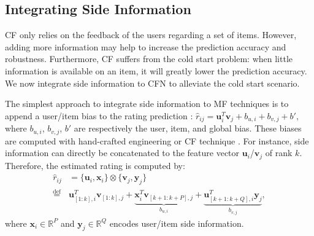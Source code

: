 \documentclass{article}
\newcommand{\mtx}[1]{\ensuremath{\mathbf{#1}}}
\begin{document}
\subsection{Integrating Side Information}
\label{sec:sideinfo}

CF only relies on the feedback of the users regarding a set of items. However, adding more information may help to increase the prediction accuracy and robustness. Furthermore, CF suffers from the cold start problem: when little information is available on an item, it will greatly lower the prediction accuracy. We now integrate side information to CFN to alleviate the cold start scenario. 

The simplest approach to integrate side information to MF techniques is to append a user/item bias to the rating prediction \cite{Koren2009}: 
$\hat{r}_{ij} = \mtx{u}_i^T\mtx{v}_j + b_{u,i} + b_{v,j} + b',$
where $b_{u,i}$, $b_{v,j}$, $b'$ are respectively the user, item, and global bias. These biases are computed with hand-crafted engineering or CF technique \cite{Chen2012,Porteous2010,Rendle2010}. For instance, side information can directly be concatenated to the feature vector $\mtx{u}_i$/$\mtx{v}_j$ of rank $k$. Therefore, the estimated rating is computed by:
\begin{align}\label{eq:side_info1}
\hat{r}_{ij} &= \{\mtx{u}_i, \mtx{x}_i\} \otimes \{\mtx{v}_j, \mtx{y}_j\} \\
 \stackrel{\text{def}}{=} &
\mtx{u}_{[1:k], i}^T\mtx{v}_{[1:k], j} + 
\underbrace{\mtx{x}_i^T\mtx{v}_{[k+1:k+P], j}}_{b_{u,i}} +
\underbrace{\mtx{u}_{[k+1:k+Q], i}^T\mtx{y}_j}_{b_{v,j}},
\end{align}
where $\mtx{x}_i \in \mathbb{R}^{P}$ and $\mtx{y}_j \in \mathbb{R}^{Q}$ encodes user/item side information.
\end{document}
